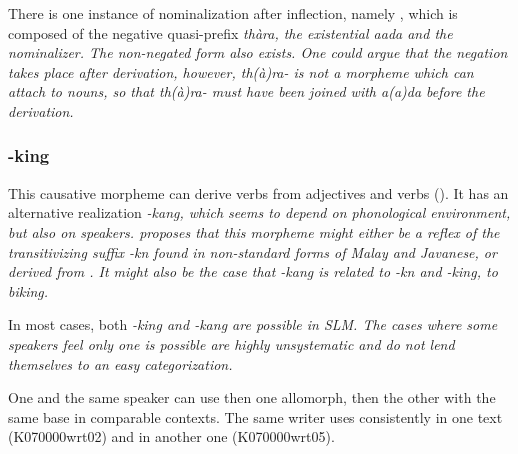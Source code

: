 There is one instance of nominalization after inflection, namely , which is composed of the negative quasi-prefix \em thàra\em, the existential \em aada \em and the nominalizer. The non-negated form  also exists. One could argue that the negation takes place after derivation, however, \em th(à)ra- \em is not a morpheme which can attach to nouns, so that  \em th(à)ra- \em must have been joined with \em a(a)da \em before the derivation.

% 
% 
% 
% 

\subsubsection{-king}\label{sec:morph:-king}
This causative morpheme  can derive verbs from  adjectives and verbs (\citet[28]{Adelaar1991}). It has an alternative realization \em -kang\em, which seems to depend on phonological environment, but also on speakers. 
\citet[29]{Adelaar1991} proposes that this morpheme might either be a reflex of the transitivizing suffix \em -k\E n \em found in non-standard forms of Malay and Javanese, or derived from . It might also be the case that \em -kang \em is related to \em -k\E n \em and \em -king, \em to \em biking\em.

In most cases, both \em -king \em and \em -kang \em are possible in SLM. 
The cases where some speakers feel only one is possible are highly unsystematic and do not lend themselves to an easy categorization.

One and the same speaker can use then one allomorph, then the other with the same base in comparable contexts. The same writer uses  consistently in one text (K070000wrt02) and  in another one (K070000wrt05).


 \\
 \\

